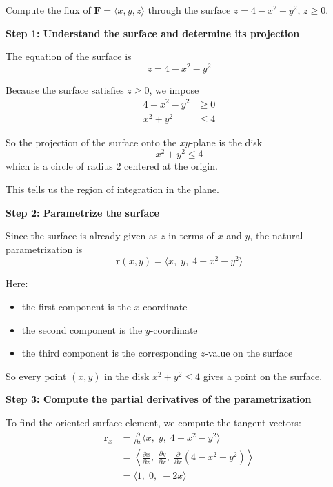 \begin{examplebox}
    Compute the flux of $\mathbf{F}=\langle x,y,z \rangle$ through the surface $z=4-x^2-y^2$, $z\ge0$.


    \textbf{Step 1: Understand the surface and determine its projection}

    The equation of the surface is
    \begin{equation*}
        z=4-x^2-y^2
    \end{equation*}

    Because the surface satisfies $z\ge 0$, we impose
    \begin{align*}
        4-x^2-y^2 & \ge 0 \\
        x^2+y^2   & \le 4
    \end{align*}

    So the projection of the surface onto the $xy$-plane is the disk
    \begin{equation*}
        x^2+y^2 \le 4
    \end{equation*}
    which is a circle of radius $2$ centered at the origin.

    This tells us the region of integration in the plane.

    \textbf{Step 2: Parametrize the surface}

    Since the surface is already given as $z$ in terms of $x$ and $y$, the natural parametrization is
    \begin{equation*}
        \mathbf{r}(x,y)=\langle x,\; y,\; 4-x^2-y^2\rangle
    \end{equation*}

    Here:
    \begin{itemize}
        \item the first component is the $x$-coordinate
        \item the second component is the $y$-coordinate
        \item the third component is the corresponding $z$-value on the surface
    \end{itemize}

    So every point $(x,y)$ in the disk $x^2+y^2\le 4$ gives a point on the surface.

    \textbf{Step 3: Compute the partial derivatives of the parametrization}

    To find the oriented surface element, we compute the tangent vectors:
    \begin{align*}
        \mathbf{r}_x
         & = \frac{\partial}{\partial x}\langle x,\; y,\; 4-x^2-y^2\rangle                                                                       \\
         & = \left\langle \frac{\partial x}{\partial x},\; \frac{\partial y}{\partial x},\; \frac{\partial}{\partial x}(4-x^2-y^2) \right\rangle \\
         & = \langle 1,\; 0,\; -2x \rangle
    \end{align*}


\end{examplebox}
